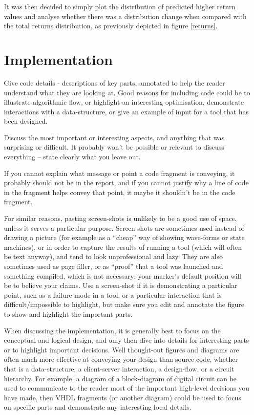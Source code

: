 \documentclass[10pt,onecolumn,letterpaper]{article}
\begin{document}
It was then decided to simply plot the distribution of predicted higher return values and analyse whether there was a distribution change when compared with the total returns distribution, as previously depicted in figure \ref{returns}.

\newpage

\section{Implementation} \label{implementation}

\iffalse
Give code details - descriptions of key parts, annotated to help the reader understand what they are looking at. Good reasons for including code could be to illustrate algorithmic flow, or highlight an interesting optimisation, demonstrate interactions with a data-structure, or give an example of input for a tool that has been designed.

Discuss the most important or interesting aspects, and anything that was surprising or difficult. It probably won't be possible or relevant to discuss everything – state clearly what you leave out.

If you cannot explain what message or point a code fragment is conveying,  it probably should not be in the report, and if you cannot justify why a line of code in the fragment helps convey that point, it maybe it shouldn’t be in the code fragment.

For similar reasons, pasting screen-shots is unlikely to be a good use of space, unless it serves a particular purpose. Screen-shots are sometimes used instead of drawing a picture (for example as a “cheap” way of showing wave-forms or state machines), or in order to capture the results of running a tool (which will often be text anyway), and tend to look unprofessional and lazy. They are also sometimes used as page filler, or as “proof” that a tool was launched and something compiled, which is not necessary: your marker’s default position will be to believe your claims. Use a screen-shot if it is demonstrating a particular point, such as a failure mode in a tool, or a particular interaction that is difficult/impossible to highlight, but make sure you edit and annotate the figure to show and highlight the important parts.

When discussing the implementation, it is generally best to focus on the conceptual and logical design, and only then dive into details for interesting parts or to highlight important decisions. Well thought-out figures and diagrams are often much more effective at conveying your design than source code, whether that is a data-structure, a client-server interaction, a design-flow, or a circuit hierarchy. For example, a diagram of a block-diagram of digital circuit can be used to communicate to the reader most of the important high-level  decisions you have made, then VHDL fragments (or another diagram) could be used to focus on specific parts and demonstrate any interesting local details.
\end{document}
